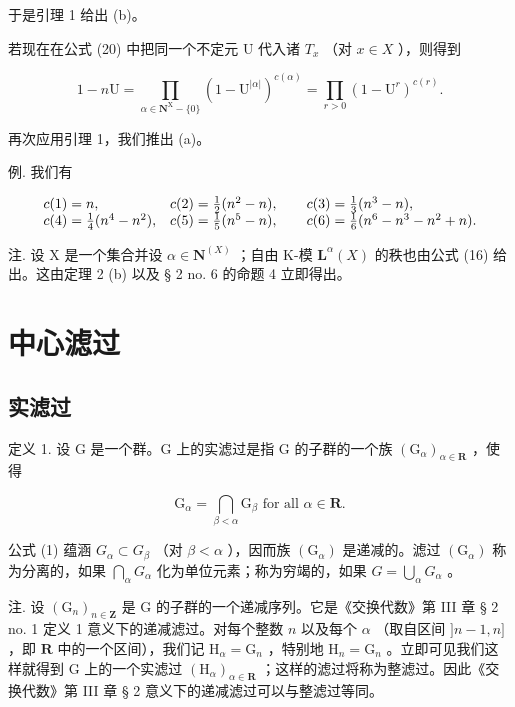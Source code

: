 于是引理 1 给出 (b)。

若现在在公式 (20) 中把同一个不定元 U 代入诸 \(T_{x}\) （对 \(x \in X\) ），则得到

\[
1 - n \mathrm{U} = \prod_ {\alpha \in \mathbf {N} ^ {\mathrm{X}} - \{0\}} (1 - \mathrm{U} ^ {| \alpha |}) ^ {c (\alpha)} = \prod_ {r > 0} (1 - \mathrm{U} ^ {r}) ^ {c (r)}.
\]

再次应用引理 1，我们推出 (a)。

例. 我们有

\[
\begin{array}{l l} c (1) = n, & c (2) = \frac {1}{2} (n ^ {2} - n), \qquad c (3) = \frac {1}{3} (n ^ {3} - n), \\ c (4) = \frac {1}{4} (n ^ {4} - n ^ {2}), & c (5) = \frac {1}{5} (n ^ {5} - n), \qquad c (6) = \frac {1}{6} (n ^ {6} - n ^ {3} - n ^ {2} + n). \end{array}
\]

注. 设 X 是一个集合并设 \(\alpha \in \mathbf{N}^{(X)}\) ；自由 K-模 \(\mathbf{L}^{\alpha}(X)\) 的秩也由公式 (16) 给出。这由定理 2 (b) 以及 § 2 no. 6 的命题 4 立即得出。

\section{中心滤过}

\subsection{实滤过}

定义 1. 设 G 是一个群。G 上的实滤过是指 G 的子群的一个族 \((\mathrm{G}_{\alpha})_{\alpha \in \mathbf{R}}\) ，使得

\[
\mathrm{G} _ {\alpha} = \bigcap_ {\beta <   \alpha} \mathrm{G} _ {\beta} \text {   for   all   } \alpha \in \mathbf {R}.\tag{1}
\]

公式 (1) 蕴涵 \(G_{\alpha} \subset G_{\beta}\) （对 \(\beta < \alpha\) ），因而族 \((\mathrm{G}_{\alpha})\) 是递减的。滤过 \((\mathrm{G}_{\alpha})\) 称为分离的，如果 \(\bigcap_{\alpha} G_{\alpha}\) 化为单位元素；称为穷竭的，如果 \(G = \bigcup_{\alpha} G_{\alpha}\) 。

注. 设 \((\mathrm{G}_n)_{n\in \mathbf{Z}}\) 是 G 的子群的一个递减序列。它是《交换代数》第 III 章 § 2 no. 1 定义 1 意义下的递减滤过。对每个整数 \(n\) 以及每个 \(\alpha\) （取自区间 \(]n - 1,n]\) ，即 \(\mathbf{R}\) 中的一个区间），我们记 \(\mathrm{H}_{\alpha} = \mathrm{G}_{n}\) ，特别地 \(\mathrm{H}_n = \mathrm{G}_n\) 。立即可见我们这样就得到 G 上的一个实滤过 \((\mathrm{H}_{\alpha})_{\alpha \in \mathbf{R}}\) ；这样的滤过将称为整滤过。因此《交换代数》第 III 章 § 2 意义下的递减滤过可以与整滤过等同。

